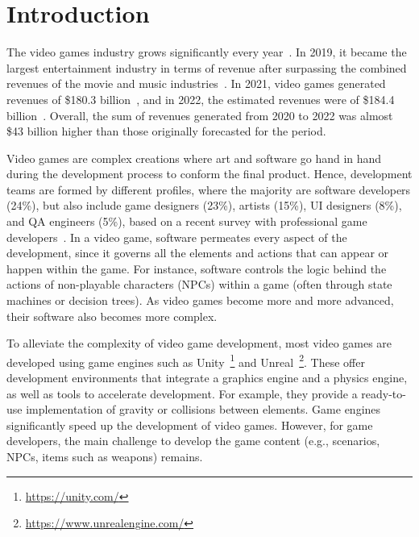 \section{Introduction}
\label{sec:intro}


The video games industry grows significantly every year~\cite{rykala2020growth}. In 2019, it became the largest entertainment industry in terms of revenue after surpassing the combined revenues of the movie and music industries~\cite{politowski2021game}. In 2021, video games generated revenues of \$180.3 billion~\cite{wijman2021games}, and in 2022, the estimated revenues were of \$184.4 billion~\cite{wijman2022games}. Overall, the sum of revenues generated from 2020 to 2022 was almost \$43 billion higher than those originally forecasted for the period. 


Video games are complex creations where art and software go hand in hand during the development process to conform the final product. Hence, development teams are formed by different profiles, where the majority are software developers (24\%), but also include game designers (23\%), artists (15\%), UI designers (8\%), and QA engineers (5\%), based on a recent survey with professional game developers~\cite{devNation}. In a video game, software permeates every aspect of the development, since it governs all the elements and actions that can appear or happen within the game. For instance, software controls the logic behind the actions of non-playable characters (NPCs) within a game (often through state machines or decision trees). As video games become more and more advanced, their software also becomes more complex.

To alleviate the complexity of video game development, most video games are developed using game engines such as Unity~\footnote{\url{https://unity.com/}} and Unreal~\footnote{\url{https://www.unrealengine.com/}}. These offer development environments that integrate a graphics engine and a physics engine, as well as tools to accelerate development. For example, they provide a ready-to-use implementation of gravity or collisions between elements. Game engines significantly speed up the development of video games. However, for game developers, the main challenge to develop the game content (e.g., scenarios, NPCs, items such as weapons) remains. %

